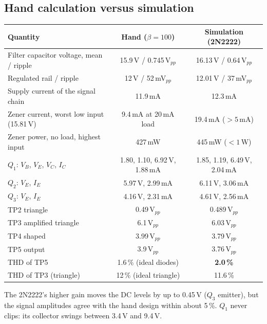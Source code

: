 \subsection{Hand calculation versus simulation}
\begin{center}
\small
\begin{tabular}{@{}lcc@{}}
\toprule
Quantity & Hand ($\beta=100$) & Simulation (2N2222) \\
\midrule
Filter capacitor voltage, mean / ripple & 15.9\,V / 0.745\,V$_{pp}$ & 16.13\,V / 0.64\,V$_{pp}$ \\
Regulated rail / ripple & 12\,V / 52\,mV$_{pp}$ & 12.01\,V / 37\,mV$_{pp}$ \\
Supply current of the signal chain & 11.9\,mA & 12.3\,mA \\
Zener current, worst low input (15.81\,V) & 9.4\,mA at 20\,mA load & 19.4\,mA ($>5$\,mA) \\
Zener power, no load, highest input & 427\,mW & 445\,mW ($<1$\,W) \\
$Q_1$: $V_B$, $V_E$, $V_C$, $I_C$ & 1.80, 1.10, 6.92\,V, 1.88\,mA & 1.85, 1.19, 6.49\,V, 2.04\,mA \\
$Q_2$: $V_E$, $I_E$ & 5.97\,V, 2.99\,mA & 6.11\,V, 3.06\,mA \\
$Q_3$: $V_E$, $I_E$ & 4.16\,V, 2.31\,mA & 4.61\,V, 2.56\,mA \\
TP2 triangle & 0.49\,V$_{pp}$ & 0.489\,V$_{pp}$ \\
TP3 amplified triangle & 6.1\,V$_{pp}$ & 6.03\,V$_{pp}$ \\
TP4 shaped & 3.99\,V$_{pp}$ & 3.79\,V$_{pp}$ \\
TP5 output & 3.9\,V$_{pp}$ & 3.76\,V$_{pp}$ \\
THD of TP5 & 1.6\,\% (ideal diodes) & \textbf{2.0\,\%} \\
THD of TP3 (triangle) & 12\,\% (ideal triangle) & 11.6\,\% \\
\bottomrule
\end{tabular}
\end{center}
The 2N2222's higher gain moves the DC levels by up to 0.45\,V ($Q_3$ emitter), but the signal amplitudes agree with the hand design within about 5\,\%. $Q_1$ never clips: its collector swings between 3.4\,V and 9.4\,V.

